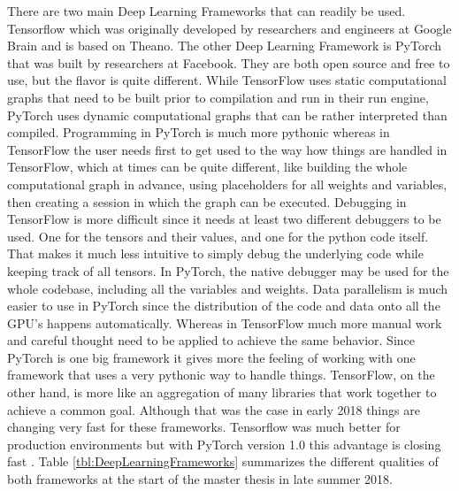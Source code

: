 There are two main Deep Learning Frameworks that can readily be used. Tensorflow \cite{tensorflow} which was originally developed by researchers and engineers at Google Brain and is based on Theano. The other Deep Learning Framework is PyTorch \cite{pytorch} that was built by researchers at Facebook. They are both open source and free to use, but the flavor is quite different. While TensorFlow uses static computational graphs that need to be built prior to compilation and run in their run engine, PyTorch uses dynamic computational graphs that can be rather interpreted than compiled. Programming in PyTorch is much more pythonic whereas in TensorFlow the user needs first to get used to the way how things are handled in TensorFlow, which at times can be quite different, like building the whole computational graph in advance, using placeholders for all weights and variables, then creating a session in which the graph can be executed. Debugging in TensorFlow is more difficult since it needs at least two different debuggers to be used. One for the tensors and their values, and one for the python code itself. That makes it much less intuitive to simply debug the underlying code while keeping track of all tensors. In PyTorch, the native debugger may be used for the whole codebase, including all the variables and weights. Data parallelism is much easier to use in PyTorch since the distribution of the code and data onto all the GPU's happens automatically. Whereas in TensorFlow much more manual work and careful thought need to be applied to achieve the same behavior. Since PyTorch is one big framework it gives more the feeling of working with one framework that uses a very pythonic way to handle things. TensorFlow, on the other hand, is more like an aggregation of many libraries that work together to achieve a common goal. Although that was the case in early 2018 things are changing very fast for these frameworks. Tensorflow was much better for production environments but with PyTorch version 1.0 this advantage is closing fast \cite{pytorchOnePointZero}. Table \ref{tbl:DeepLearningFrameworks} summarizes the different qualities of both frameworks at the start of the master thesis in late summer 2018. \\

